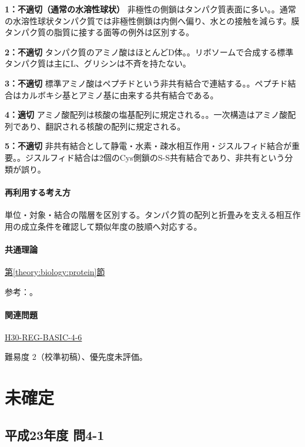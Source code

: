 \noindent\textbf{1：不適切（通常の水溶性球状）} 非極性の側鎖はタンパク質表面に多い。。通常の水溶性球状タンパク質では非極性側鎖は内側へ偏り、水との接触を減らす。膜タンパク質の脂質に接する面等の例外は区別する。\par

\noindent\textbf{2：不適切} タンパク質のアミノ酸はほとんどD体。。リボソームで合成する標準タンパク質は主にL、グリシンは不斉を持たない。\par

\noindent\textbf{3：不適切} 標準アミノ酸はペプチドという非共有結合で連結する。。ペプチド結合はカルボキシ基とアミノ基に由来する共有結合である。\par

\noindent\textbf{4：適切} アミノ酸配列は核酸の塩基配列に規定される。。一次構造はアミノ酸配列であり、翻訳される核酸の配列に規定される。\par

\noindent\textbf{5：不適切} 非共有結合として静電・水素・疎水相互作用・ジスルフィド結合が重要。。ジスルフィド結合は2個のCys側鎖のS-S共有結合であり、非共有という分類が誤り。\par

\paragraph{再利用する考え方} 単位・対象・結合の階層を区別する。タンパク質の配列と折畳みを支える相互作用の成立条件を確認して類似年度の肢順へ対応する。

\paragraph{共通理論} \hyperref[theory:biology:protein]{第\ref*{theory:biology:protein}節}

\par 参考：\cite{mit_protein}。

\paragraph{関連問題} \hyperref[q:h30-reg-basic-4-6]{H30-REG-BASIC-4-6}

\par 難易度 2（校準初稿）、優先度未評価。

\section{未確定}

\subsection{平成23年度 問4-1}
\label{q:h23-reg-basic-4-1}

